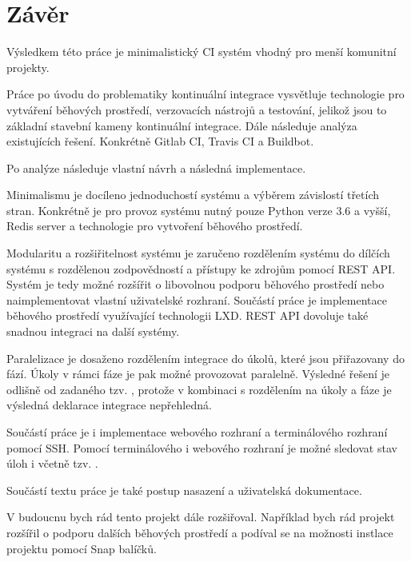 \chapter{Závěr}

Výsledkem této práce je minimalistický CI systém vhodný pro menší komunitní projekty.

Práce po úvodu do problematiky kontinuální integrace vysvětluje technologie pro vytváření běhových prostředí, verzovacích nástrojů a testování, jelikož jsou to základní stavební kameny kontinuální integrace.
Dále následuje analýza existujících řešení.
Konkrétně Gitlab CI, Travis CI a Buildbot.

Po analýze následuje vlastní návrh a následná implementace.

Minimalismu je docíleno jednoduchostí systému a výběrem závislostí třetích stran.
Konkrétně je pro provoz systému nutný pouze Python verze 3.6 a vyšší, Redis server a technologie pro vytvoření běhového prostředí.

Modularitu a rozšiřitelnost systému je zaručeno rozdělením systému do dílčích systému s rozdělenou zodpovědností a přístupy ke zdrojům pomocí REST API.
Systém je tedy možné rozšířit o libovolnou podporu běhového prostředí nebo naimplementovat vlastní uživatelské rozhraní.
Součástí práce je implementace běhového prostředí využívající technologii LXD.
REST API dovoluje také snadnou integraci na další systémy.

Paralelizace je dosaženo rozdělením integrace do úkolů, které jsou přiřazovany do fází.
Úkoly v rámci fáze je pak možné provozovat paralelně.
Výsledné řešení je odlišně od zadaného tzv. , protože v kombinaci s rozdělením na úkoly a fáze je výsledná deklarace integrace nepřehledná.

Součástí práce je i implementace webového rozhraní a terminálového rozhraní pomocí SSH.
Pomocí terminálového i webového rozhraní je možné sledovat stav úloh i včetně tzv. .

Součástí textu práce je také postup nasazení a uživatelská dokumentace.

V budoucnu bych rád tento projekt dále rozšiřoval.
Například bych rád projekt rozšířil o podporu dalších běhových prostředí a podíval se na možnosti instlace projektu pomocí Snap balíčků.



